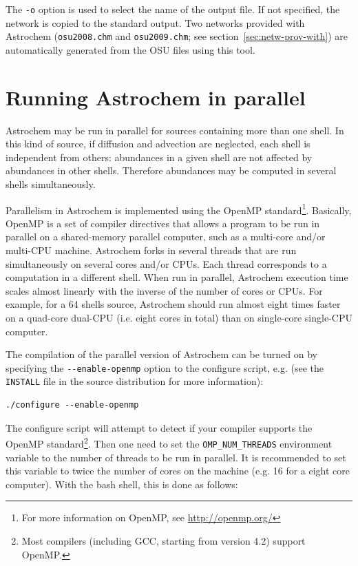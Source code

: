 \documentclass[a4paper,12pt]{article}
\begin{document}
\noindent
The \verb=-o= option is used to select the name of the output file. If
not specified, the network is copied to the standard output. Two
networks provided with Astrochem (\verb=osu2008.chm= and
\verb=osu2009.chm=; see section~\ref{sec:netw-prov-with}) are
automatically generated from the OSU files using this tool.

\section{Running Astrochem in parallel}
\label{sec:runn-astr-parall}

Astrochem may be run in parallel for sources containing more than one
shell. In this kind of source, if diffusion and advection are
neglected, each shell is independent from others: abundances in a
given shell are not affected by abundances in other shells. Therefore
abundances may be computed in several shells simultaneously.

Parallelism in Astrochem is implemented using the OpenMP
standard\footnote{For more information on OpenMP, see
  \url{http://openmp.org/}}. Basically, OpenMP is a set of compiler
directives that allows a program to be run in parallel on a
shared-memory parallel computer, such as a multi-core and/or multi-CPU
machine. Astrochem forks in several threads that are run simultaneously
on several cores and/or CPUs. Each thread corresponds to a computation
in a different shell. When run in parallel, Astrochem execution time
scales almost linearly with the inverse of the number of cores or
CPUs. For example, for a 64 shells source, Astrochem should run almost
eight times faster on a quad-core dual-CPU (i.e. eight cores in total)
than on single-core single-CPU computer.

The compilation of the parallel version of Astrochem can be turned on
by specifying the \verb=--enable-openmp= option to the configure
script, e.g. (see the \verb=INSTALL= file in the source distribution
for more information):

\begin{verbatim}
./configure --enable-openmp
\end{verbatim}
 
\noindent
The configure script will attempt to detect if your compiler supports
the OpenMP standard\footnote{Most compilers (including GCC, starting
  from version 4.2) support OpenMP.}. Then one need to set the
\verb=OMP_NUM_THREADS= environment variable to the number of threads
to be run in parallel. It is recommended to set this variable to twice
the number of cores on the machine (e.g. 16 for a eight core
computer). With the bash shell, this is done as follows:
\end{document}
